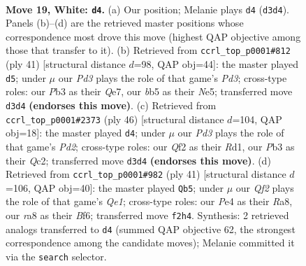 \documentclass[11pt]{article}
\begin{document}
\clearpage

\begin{figure}[p]\centering
\begin{subfigure}{0.46\textwidth}\centering
\resizebox{\linewidth}{!}{%
\newchessgame
\chessboard[
  setfen={r3kb1r/1p2pp1n/1B1p2p1/1b5p/4P3/1P1P1P2/P4QPP/2K1R2R w kq - 0 19},
  showmover=false,
  pgfstyle=straightmove, color=movearrow, markmove={d3-d4}
]}
\caption{}
\end{subfigure}\hfill
\begin{subfigure}{0.46\textwidth}\centering
\resizebox{\linewidth}{!}{%
\newchessgame
\chessboard[
  setfen={r3r1k1/1p2q2p/2ppb1p1/p3n3/2PR4/6N1/PP2BPPP/2Q1R1K1 b - - 2 21},
  showmover=false,
  pgfstyle=straightmove, color=movearrow, markmove={d6-d5}
]}
\caption{}
\end{subfigure}
\\[4pt]
\begin{subfigure}{0.46\textwidth}\centering
\resizebox{\linewidth}{!}{%
\newchessgame
\chessboard[
  setfen={1r4k1/1b2bpp1/4p2p/qPpn4/P7/4P2P/2QP1PP1/2RR1BK1 w - - 5 24},
  showmover=false,
  pgfstyle=straightmove, color=movearrow, markmove={d2-d4}
]}
\caption{}
\end{subfigure}\hfill
\begin{subfigure}{0.46\textwidth}\centering
\resizebox{\linewidth}{!}{%
\newchessgame
\chessboard[
  setfen={r3qr1k/p1p3pp/1p2pb2/8/6Q1/2PRB3/PP3PPP/R5K1 b - - 1 21},
  showmover=false,
  pgfstyle=straightmove, color=movearrow, markmove={e8-b5}
]}
\caption{}
\end{subfigure}
\caption{\textbf{Move 19, White: \texttt{d4}.} (a) Our position; Melanie plays \texttt{d4} (\texttt{d3d4}). Panels (b)--(d) are the retrieved master positions whose correspondence most drove this move (highest QAP objective among those that transfer to it). (b) Retrieved from \texttt{ccrl\_top\_p0001\#812} (ply 41) [structural distance $d$=98, QAP obj=44]: the master played \texttt{d5}; under $\mu$ our \emph{Pd3} plays the role of that game's \emph{Pd3}; cross-type roles: our \emph{P}b3 as their \emph{Q}e7, our \emph{b}b5 as their \emph{N}e5; transferred move \texttt{d3d4} \textbf{(endorses this move)}. (c) Retrieved from \texttt{ccrl\_top\_p0001\#2373} (ply 46) [structural distance $d$=104, QAP obj=18]: the master played \texttt{d4}; under $\mu$ our \emph{Pd3} plays the role of that game's \emph{Pd2}; cross-type roles: our \emph{Q}f2 as their \emph{R}d1, our \emph{P}b3 as their \emph{Q}c2; transferred move \texttt{d3d4} \textbf{(endorses this move)}. (d) Retrieved from \texttt{ccrl\_top\_p0001\#982} (ply 41) [structural distance $d$=106, QAP obj=40]: the master played \texttt{Qb5}; under $\mu$ our \emph{Qf2} plays the role of that game's \emph{Qe1}; cross-type roles: our \emph{P}e4 as their \emph{R}a8, our \emph{r}a8 as their \emph{B}f6; transferred move \texttt{f2h4}. Synthesis: 2 retrieved analogs transferred to \texttt{d4} (summed QAP objective 62, the strongest correspondence among the candidate moves); Melanie committed it via the \texttt{search} selector.}
\label{fig:thought-m36}
\end{figure}
\end{document}
